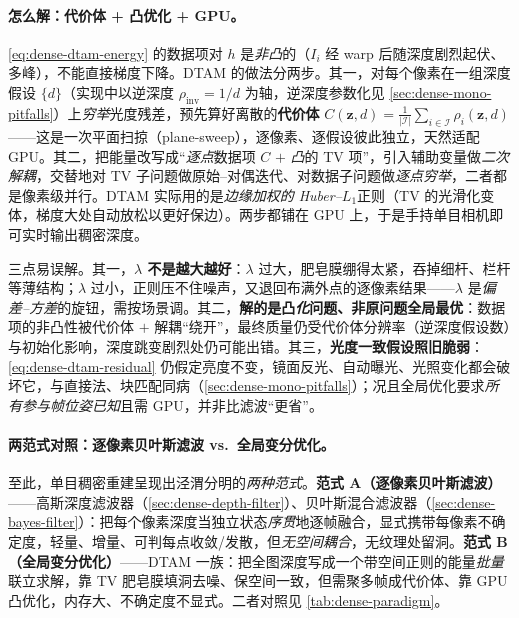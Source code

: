 \paragraph{怎么解：代价体 + 凸优化 + GPU。}
\cref{eq:dense-dtam-energy} 的数据项对 $h$ 是\emph{非凸}的（$I_i$ 经 warp 后随深度剧烈起伏、多峰），不能直接梯度下降。DTAM 的做法分两步\cite{newcombe2011dtam}。其一，对每个像素在一组深度假设 $\{d\}$（实现中以逆深度 $\rho_{\mathrm{inv}}=1/d$ 为轴，逆深度参数化见 \cref{sec:dense-mono-pitfalls}）上\emph{穷举}光度残差，预先算好离散的\textbf{代价体} $C(\mathbf{z},d)=\frac1{|\mathcal{I}|}\sum_{i\in\mathcal{I}}\rho_i(\mathbf{z},d)$——这是一次平面扫掠（plane-sweep），逐像素、逐假设彼此独立，天然适配 GPU。其二，把能量改写成“\emph{逐点}数据项 $C$ $+$ \emph{凸}的 TV 项”，引入辅助变量做\emph{二次解耦}，交替地对 TV 子问题做原始--对偶迭代、对数据子问题做\emph{逐点穷举}，二者都是像素级并行。DTAM 实际用的是\emph{边缘加权的 Huber--$L_1$}正则（TV 的光滑化变体，梯度大处自动放松以更好保边）。两步都铺在 GPU 上，于是手持单目相机即可实时输出稠密深度。

\begin{pitfall}
三点易误解。其一，\textbf{$\lambda$ 不是越大越好}：$\lambda$ 过大，肥皂膜绷得太紧，吞掉细杆、栏杆等薄结构；$\lambda$ 过小，正则压不住噪声，又退回布满外点的逐像素结果——$\lambda$ 是\emph{偏差--方差}的旋钮，需按场景调。其二，\textbf{解的是凸\emph{化}问题、非原问题全局最优}：数据项的非凸性被代价体 $+$ 解耦“绕开”，最终质量仍受代价体分辨率（逆深度假设数）与初始化影响，深度跳变剧烈处仍可能出错。其三，\textbf{光度一致假设照旧脆弱}：\cref{eq:dense-dtam-residual} 仍假定亮度不变，镜面反光、自动曝光、光照变化都会破坏它，与直接法、块匹配同病（\cref{sec:dense-mono-pitfalls}）；况且全局优化要求\emph{所有参与帧位姿已知}且需 GPU，并非比滤波“更省”。
\end{pitfall}

\paragraph{两范式对照：逐像素贝叶斯滤波 vs.\ 全局变分优化。}
至此，单目稠密重建呈现出泾渭分明的\emph{两种范式}。\textbf{范式 A（逐像素贝叶斯滤波）}——高斯深度滤波器（\cref{sec:dense-depth-filter}）、贝叶斯混合滤波器（\cref{sec:dense-bayes-filter}）：把每个像素深度当独立状态\emph{序贯}地逐帧融合，显式携带每像素不确定度，轻量、增量、可判每点收敛/发散，但\emph{无空间耦合}，无纹理处留洞。\textbf{范式 B（全局变分优化）}——DTAM 一族：把全图深度写成一个带空间正则的能量\emph{批量}联立求解，靠 TV 肥皂膜填洞去噪、保空间一致，但需聚多帧成代价体、靠 GPU 凸优化，内存大、不确定度不显式。二者对照见 \cref{tab:dense-paradigm}。

